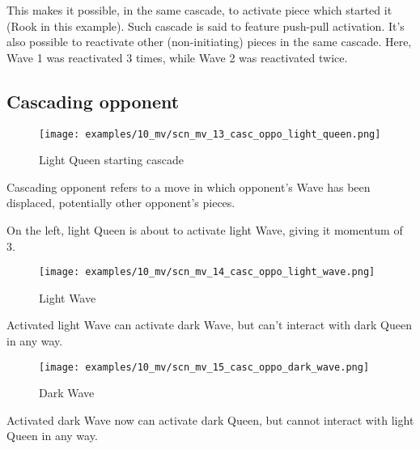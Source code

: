 \label{txt:Miranda's veil/Cascading Waves/Push-pull activation}
This makes it possible, in the same cascade, to activate piece which started it
(Rook in this example). Such cascade is said to feature push-pull activation.
It's also possible to reactivate other (non-initiating) pieces in the same
cascade. Here, Wave 1 was reactivated 3 times, while Wave 2 was reactivated
twice.

\clearpage %

\subsection*{Cascading opponent}

\noindent
\begin{wrapfigure}[10]{l}{0.5625\textwidth}
\centering
\texttt{[image: examples/10\_mv/scn\_mv\_13\_casc\_oppo\_light\_queen.png]}
\caption{Light Queen starting cascade}
\label{fig:scn_mv_13_casc_oppo_light_queen}
\end{wrapfigure}
Cascading opponent refers to a move in which opponent's Wave has been displaced,
potentially other opponent's pieces.

On the left, light Queen is about to activate light Wave, giving it momentum of 3.

\vspace*{0.155\textheight}
\noindent
\begin{wrapfigure}[5]{r}{0.5625\textwidth}
\centering
\texttt{[image: examples/10\_mv/scn\_mv\_14\_casc\_oppo\_light\_wave.png]}
\caption{Light Wave}
\label{fig:scn_mv_14_casc_oppo_light_wave}
\end{wrapfigure}
Activated light Wave can activate dark Wave, but can't interact with dark Queen in
any way.

\clearpage %

\noindent
\begin{wrapfigure}[5]{l}{0.5625\textwidth}
\centering
\texttt{[image: examples/10\_mv/scn\_mv\_15\_casc\_oppo\_dark\_wave.png]}
\caption{Dark Wave}
\label{fig:scn_mv_15_casc_oppo_dark_wave}
\end{wrapfigure}
Activated dark Wave now can activate dark Queen, but cannot interact with light Queen
in any way.

